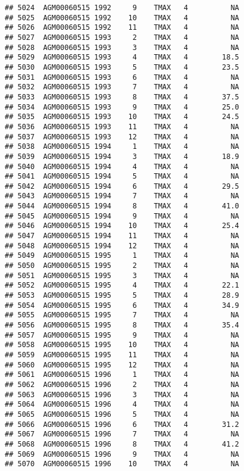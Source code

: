 \documentclass{article}\usepackage[]{graphicx}\usepackage[]{color}
\makeatletter
\newenvironment{kframe}{%
 \def\at@end@of@kframe{}%
 \ifinner\ifhmode%
  \def\at@end@of@kframe{\end{minipage}}%
  \begin{minipage}{\columnwidth}%
 \fi\fi%
 \def\FrameCommand##1{\hskip\@totalleftmargin \hskip-\fboxsep
 \colorbox{shadecolor}{##1}\hskip-\fboxsep
     \hskip-\linewidth \hskip-\@totalleftmargin \hskip\columnwidth}%
 \MakeFramed {\advance\hsize-\width
   \@totalleftmargin\z@ \linewidth\hsize
   \@setminipage}}%
 {\par\unskip\endMakeFramed%
 \at@end@of@kframe}
\newenvironment{knitrout}{}{} %
\makeatother
\begin{document}
\begin{knitrout}
\begin{kframe}
\begin{verbatim}
## 5024  AGM00060515 1992     9    TMAX   4          NA
## 5025  AGM00060515 1992    10    TMAX   4          NA
## 5026  AGM00060515 1992    11    TMAX   4          NA
## 5027  AGM00060515 1993     2    TMAX   4          NA
## 5028  AGM00060515 1993     3    TMAX   4          NA
## 5029  AGM00060515 1993     4    TMAX   4        18.5
## 5030  AGM00060515 1993     5    TMAX   4        23.5
## 5031  AGM00060515 1993     6    TMAX   4          NA
## 5032  AGM00060515 1993     7    TMAX   4          NA
## 5033  AGM00060515 1993     8    TMAX   4        37.5
## 5034  AGM00060515 1993     9    TMAX   4        25.0
## 5035  AGM00060515 1993    10    TMAX   4        24.5
## 5036  AGM00060515 1993    11    TMAX   4          NA
## 5037  AGM00060515 1993    12    TMAX   4          NA
## 5038  AGM00060515 1994     1    TMAX   4          NA
## 5039  AGM00060515 1994     3    TMAX   4        18.9
## 5040  AGM00060515 1994     4    TMAX   4          NA
## 5041  AGM00060515 1994     5    TMAX   4          NA
## 5042  AGM00060515 1994     6    TMAX   4        29.5
## 5043  AGM00060515 1994     7    TMAX   4          NA
## 5044  AGM00060515 1994     8    TMAX   4        41.0
## 5045  AGM00060515 1994     9    TMAX   4          NA
## 5046  AGM00060515 1994    10    TMAX   4        25.4
## 5047  AGM00060515 1994    11    TMAX   4          NA
## 5048  AGM00060515 1994    12    TMAX   4          NA
## 5049  AGM00060515 1995     1    TMAX   4          NA
## 5050  AGM00060515 1995     2    TMAX   4          NA
## 5051  AGM00060515 1995     3    TMAX   4          NA
## 5052  AGM00060515 1995     4    TMAX   4        22.1
## 5053  AGM00060515 1995     5    TMAX   4        28.9
## 5054  AGM00060515 1995     6    TMAX   4        34.9
## 5055  AGM00060515 1995     7    TMAX   4          NA
## 5056  AGM00060515 1995     8    TMAX   4        35.4
## 5057  AGM00060515 1995     9    TMAX   4          NA
## 5058  AGM00060515 1995    10    TMAX   4          NA
## 5059  AGM00060515 1995    11    TMAX   4          NA
## 5060  AGM00060515 1995    12    TMAX   4          NA
## 5061  AGM00060515 1996     1    TMAX   4          NA
## 5062  AGM00060515 1996     2    TMAX   4          NA
## 5063  AGM00060515 1996     3    TMAX   4          NA
## 5064  AGM00060515 1996     4    TMAX   4          NA
## 5065  AGM00060515 1996     5    TMAX   4          NA
## 5066  AGM00060515 1996     6    TMAX   4        31.2
## 5067  AGM00060515 1996     7    TMAX   4          NA
## 5068  AGM00060515 1996     8    TMAX   4        41.2
## 5069  AGM00060515 1996     9    TMAX   4          NA
## 5070  AGM00060515 1996    10    TMAX   4          NA

\end{verbatim}
\end{kframe}
\end{knitrout}
\end{document}
